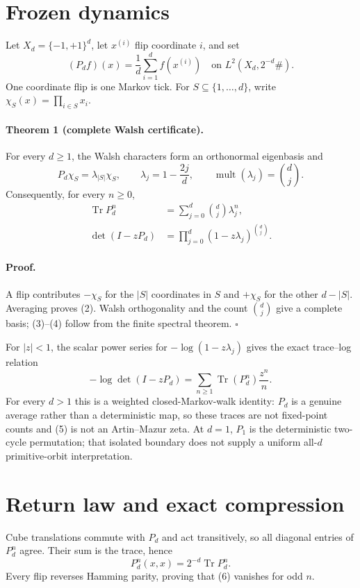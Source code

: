 \documentclass[10pt]{article}
\begin{document}
\section{Frozen dynamics}
Let $X_d=\{-1,+1\}^d$, let $x^{(i)}$ flip coordinate $i$, and set
\[
 (P_df)(x)=\frac1d\sum_{i=1}^d f(x^{(i)})
 \quad\text{on }L^2(X_d,2^{-d}\#).                              \tag{1}
\]
One coordinate flip is one Markov tick.  For $S\subseteq\{1,\ldots,d\}$,
write $\chi_S(x)=\prod_{i\in S}x_i$.

\paragraph{Theorem 1 (complete Walsh certificate).}
For every $d\geq1$, the Walsh characters form an orthonormal eigenbasis and
\[
 P_d\chi_S=\lambda_{|S|}\chi_S,\qquad
 \lambda_j=1-\frac{2j}{d},\qquad
 \operatorname{mult}(\lambda_j)=\binom dj.                     \tag{2}
\]
Consequently, for every $n\geq0$,
\begin{align}
 \operatorname{Tr}P_d^n&=\sum_{j=0}^d\binom dj\lambda_j^n,       \tag{3}\\
 \det(I-zP_d)&=\prod_{j=0}^d(1-z\lambda_j)^{\binom dj}.          \tag{4}
\end{align}

\paragraph{Proof.}
A flip contributes $-\chi_S$ for the $|S|$ coordinates in $S$ and
$+\chi_S$ for the other $d-|S|$.  Averaging proves (2).  Walsh orthogonality
and the count $\binom dj$ give a complete basis; (3)--(4) follow from the
finite spectral theorem. \hfill$\square$

For $|z|<1$, the scalar power series for $-\log(1-z\lambda_j)$ gives the
exact trace--log relation
\[
 -\log\det(I-zP_d)=\sum_{n\geq1}\operatorname{Tr}(P_d^n)\frac{z^n}{n}.
                                                                    \tag{5}
\]
For every $d>1$ this is a weighted closed-Markov-walk identity: $P_d$ is a
genuine average rather than a deterministic map, so these traces are not
fixed-point counts and (5) is not an Artin--Mazur zeta.  At $d=1$, $P_1$ is
the deterministic two-cycle permutation; that isolated boundary does not
supply a uniform all-$d$ primitive-orbit interpretation.

\section{Return law and exact compression}
Cube translations commute with $P_d$ and act transitively, so all diagonal
entries of $P_d^n$ agree.  Their sum is the trace, hence
\[
 P_d^n(x,x)=2^{-d}\operatorname{Tr}P_d^n.                       \tag{6}
\]
Every flip reverses Hamming parity, proving that (6) vanishes for odd $n$.
\end{document}
